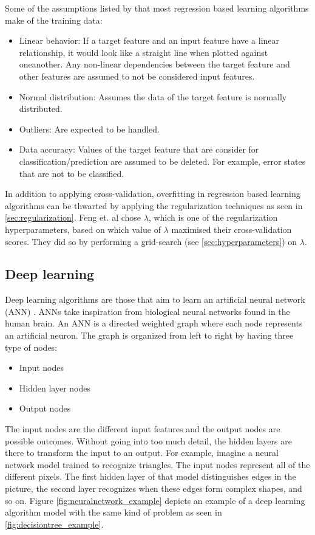 		Some of the assumptions listed by \cite{BOOK:6} that most regression based learning algorithms make of the training data:
	\begin{itemize}
		\item{Linear behavior:} If a target feature and an input feature have a linear relationship, it would look like a straight line when plotted against oneanother. Any non-linear dependencies between the target feature and other features are assumed to not be considered input features.
		\item{Normal distribution:} Assumes the data of the target feature is normally distributed.
		\item{Outliers:} Are expected to be handled.
		\item{Data accuracy:} Values of the target feature that are consider for classification/prediction are assumed to be deleted. For example, error states that are not to be classified.
	\end{itemize} %

		In addition to applying cross-validation, overfitting in regression based learning algorithms can be thwarted by applying the regularization techniques as seen in \ref{sec:regularization}. Feng et. al \cite{ARTICLE:15} chose $\lambda$, which is one of the regularization hyperparameters,  based on which value of $\lambda$ maximised their cross-validation scores. They did so by performing a grid-search (see \ref{sec:hyperparameters}) on $\lambda$. %

	\subsection{Deep learning}
			Deep learning algorithms are those that aim to learn an artificial neural network (ANN) \cite{BOOK:6}. ANNs take inspiration from biological neural networks found in the human brain. An ANN is a directed weighted graph where each node represents an artificial neuron. The graph is organized from left to right by having three type of nodes:
	\begin{itemize}
		\item Input nodes
		\item Hidden layer nodes
		\item Output nodes
	\end{itemize}
			The input nodes are the different input features and the output nodes are possible outcomes. Without going into too much detail, the hidden layers are there to transform the input to an output. For example, imagine a neural network model trained to recognize triangles. The input nodes represent all of the different pixels. The first hidden layer of that model distinguishes edges in the picture, the second layer recognizes when these edges form complex shapes, and so on. Figure \ref{fig:neuralnetwork_example} depicts an example of a deep learning algorithm model with the same kind of problem as seen in \ref{fig:decisiontree_example}.

